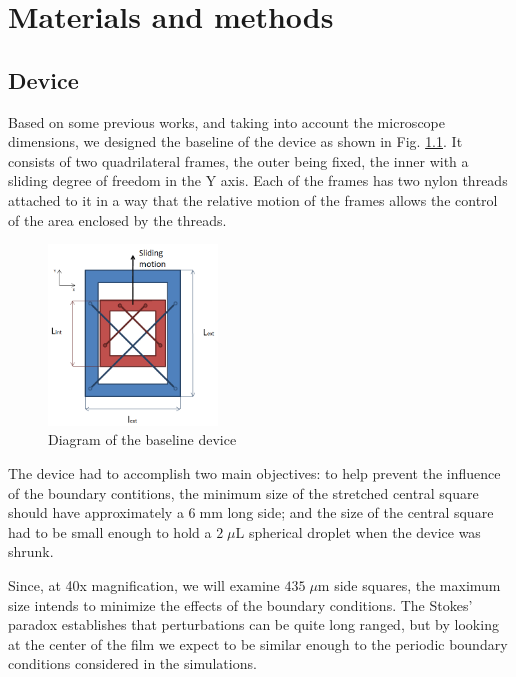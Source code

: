 \chapter{Materials and methods}
\label{materias_methods}

\section{Device}

Based on some previous works, and taking into account the microscope dimensions, we designed the baseline of the device as shown in Fig. \ref{device_baseline}. It consists of two quadrilateral frames, the outer being fixed, the inner with a sliding degree of freedom in the Y axis. Each of the frames has two nylon threads attached to it in a way that the relative motion of the frames allows the control of the area enclosed by the threads.

\begin{figure}[H]
	\centering
	\includegraphics[width=0.4\textwidth]{archivos/baseline_device.png}
	\caption{Diagram of the baseline device}
	\label{device_baseline}
\end{figure}

The device had to accomplish two main objectives: to help prevent the influence of the boundary contitions, the minimum size of the stretched central square should have approximately a $6 \; \textrm{mm}$ long side; and the size of the central square had to be small enough to hold a $2 \; \mu \textrm{L}$ spherical droplet when the device was shrunk. 

Since, at 40x magnification, we will examine $435 \; \mu \textrm{m}$ side squares, the maximum size intends to minimize the effects of the boundary conditions. The Stokes' paradox establishes that perturbations can be quite long ranged, but by looking at the center of the film we expect to be similar enough to the periodic boundary conditions considered in the simulations.

